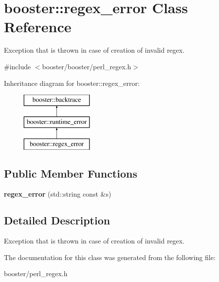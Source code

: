 \section{booster\-:\-:regex\-\_\-error \-Class \-Reference}
\label{classbooster_1_1regex__error}


\-Exception that is thrown in case of creation of invalid regex.  




{\ttfamily \#include $<$booster/booster/perl\-\_\-regex.\-h$>$}

\-Inheritance diagram for booster\-:\-:regex\-\_\-error\-:\begin{figure}[H]
\begin{center}
\leavevmode
\includegraphics[height=3.000000cm]{classbooster_1_1regex__error}
\end{center}
\end{figure}
\subsection*{\-Public \-Member \-Functions}
\begin{DoxyCompactItemize}
\item 
{\bfseries regex\-\_\-error} (std\-::string const \&s)\label{classbooster_1_1regex__error_ab47c1b94a4b23450d0d349c9fcdc62fc}

\end{DoxyCompactItemize}


\subsection{\-Detailed \-Description}
\-Exception that is thrown in case of creation of invalid regex. 

\-The documentation for this class was generated from the following file\-:\begin{DoxyCompactItemize}
\item 
booster/perl\-\_\-regex.\-h\end{DoxyCompactItemize}
